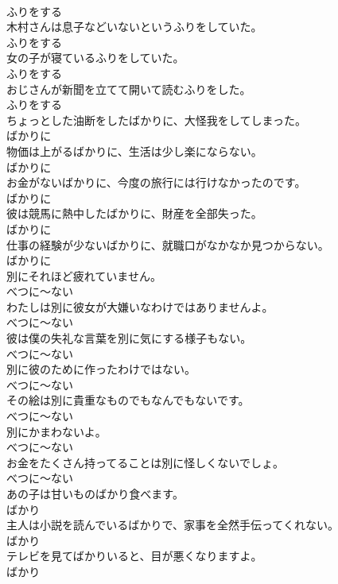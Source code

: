 \documentclass[8pt]{extreport}
\begin{document}
\begin{CJK}{UTF8}{min}
\\	ふりをする
\\	木村さんは息子などいないというふりをしていた。	
\\	ふりをする
\\	女の子が寝ているふりをしていた。	
\\	ふりをする
\\	おじさんが新聞を立てて開いて読むふりをした。	
\\	ふりをする
\\	ちょっとした油断をしたばかりに、大怪我をしてしまった。	
\\	ばかりに
\\	物価は上がるばかりに、生活は少し楽にならない。	
\\	ばかりに
\\	お金がないばかりに、今度の旅行には行けなかったのです。	
\\	ばかりに
\\	彼は競馬に熱中したばかりに、財産を全部失った。	
\\	ばかりに
\\	仕事の経験が少ないばかりに、就職口がなかなか見つからない。	
\\	ばかりに
\\	別にそれほど疲れていません。	
\\	べつに～ない
\\	わたしは別に彼女が大嫌いなわけではありませんよ。	
\\	べつに～ない
\\	彼は僕の失礼な言葉を別に気にする様子もない。	
\\	べつに～ない
\\	別に彼のために作ったわけではない。	
\\	べつに～ない
\\	その絵は別に貴重なものでもなんでもないです。	
\\	べつに～ない
\\	別にかまわないよ。	
\\	べつに～ない
\\	お金をたくさん持ってることは別に怪しくないでしょ。	
\\	べつに～ない
\\	あの子は甘いものばかり食べます。	
\\	ばかり
\\	主人は小説を読んでいるばかりで、家事を全然手伝ってくれない。	
\\	ばかり
\\	テレビを見てばかりいると、目が悪くなりますよ。	
\\	ばかり

\end{CJK}
\end{document}
